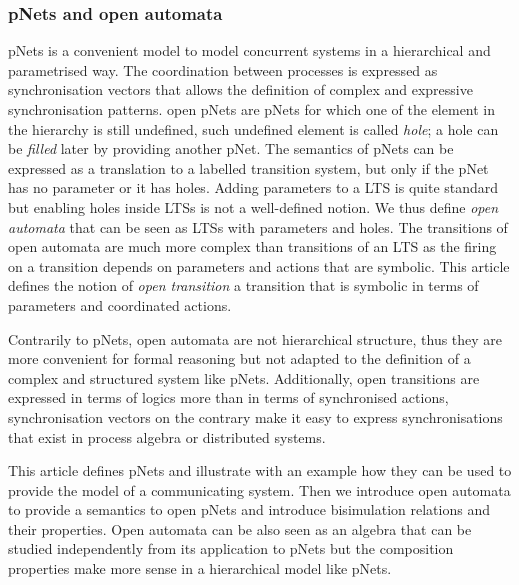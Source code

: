 \documentclass{lmcs}
\begin{document}
\subsubsection*{pNets and open automata}
pNets is a convenient model to model concurrent systems in a hierarchical and parametrised way. The coordination between processes is expressed as synchronisation vectors that allows the definition of complex and expressive synchronisation patterns.
open pNets are pNets for which one of the element in the hierarchy is still undefined, such undefined element is called \emph{hole}; a hole can be \emph{filled} later by providing another pNet.
 The semantics of pNets can be expressed as a translation to a labelled transition system, but only if the pNet has no parameter or it has holes. Adding parameters to a LTS is quite standard but enabling holes inside LTSs is not a well-defined notion. 
We thus define \emph{open automata} that can be seen as LTSs with parameters and holes. The transitions of open automata are much more complex than transitions of an LTS as the firing on a transition depends on parameters and actions that are symbolic. This article defines the notion of \emph{open transition} a transition that is symbolic in terms of parameters and coordinated actions.

Contrarily to pNets, open automata are not hierarchical structure, thus they are more convenient for formal reasoning but not adapted to the definition of a complex and structured system like pNets. Additionally, open transitions are expressed in terms of logics more than in terms of synchronised actions, synchronisation vectors on the contrary make it easy to express synchronisations that exist in process algebra or distributed systems.

This article defines pNets and illustrate with an example how they can be used to provide the model of a communicating system. Then we introduce open automata to provide a semantics to open pNets and introduce bisimulation relations and their properties.
Open automata can be also seen as an algebra that can be studied independently from its application to pNets but the composition properties make more sense in a hierarchical model like pNets.
\end{document}
